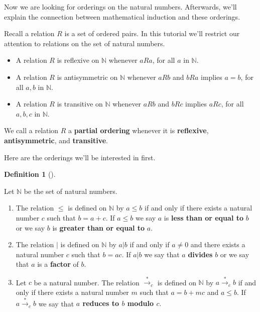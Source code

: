 \documentclass[
  twoside,
  12pt,
  letterpaper]{article}
\providecommand{\tightlist}{%
  \setlength{\itemsep}{0pt}\setlength{\parskip}{0pt}}\usepackage{longtable,booktabs,array}
\theoremstyle{definition}
\theoremstyle{plain}
\theoremstyle{plain}
\theoremstyle{definition}
\theoremstyle{definition}
\newtheorem{definition}{Definition}[section]
\theoremstyle{remark}
\begin{document}
Now we are looking for orderings on the natural numbers. Afterwards,
we'll explain the connection between mathematical induction and these
orderings.

Recall a relation \(R\) is a set of ordered pairs. In this tutorial
we'll restrict our attention to relations on the set of natural numbers.

\begin{itemize}
\tightlist
\item
  A relation \(R\) is reflexive on \(\mathbb{N}\) whenever \(aRa\), for
  all \(a\) in \(\mathbb{N}\).
\item
  A relation \(R\) is antisymmetric on \(\mathbb{N}\) whenever \(aRb\)
  and \(bRa\) implies \(a=b\), for all \(a,b\) in \(\mathbb{N}\).
\item
  A relation \(R\) is transitive on \(\mathbb{N}\) whenever \(aRb\) and
  \(bRc\) implies \(aRc\), for all \(a,b,c\) in \(\mathbb{N}\).
\end{itemize}

We call a relation \(R\) a \textbf{partial ordering} whenever it is
\textbf{reflexive}, \textbf{antisymmetric}, and \textbf{transitive}.

Here are the orderings we'll be interested in first.

\begin{definition}[]\protect\hypertarget{def-less-than-divides}{}\label{def-less-than-divides}

Let \(\mathbb{N}\) be the set of natural numbers.

\begin{enumerate}
\def\labelenumi{\arabic{enumi}.}
\tightlist
\item
  The relation \(\leq\) is defined on \(\mathbb{N}\) by \(a\leq b\) if
  and only if there exists a natural number \(c\) such that \(b=a+c.\)
  If \(a\leq b\) we say \(a\) is \textbf{less than or equal to} \(b\) or
  we say \(b\) is \textbf{greater than or equal to} \(a.\)
\item
  The relation \(\vert\) is defined on \(\mathbb{N}\) by \(a|b\) if and
  only if \(a\neq 0\) and there exists a natural number \(c\) such that
  \(b=ac.\) If \(a\vert b\) we say that \(a\) \textbf{divides} \(b\) or
  we say that \(a\) is a \textbf{factor} of \(b.\)
\item
  Let \(c\) be a natural number. The relation
  \(\overset{*}{\longrightarrow}_c\) is defined on \(\mathbb{N}\) by
  \(a\overset{*}{\longrightarrow}_c b\) if and only if there exists a
  natural number \(m\) such that \(a=b+mc\) and \(a\leq b.\) If
  \(a\overset{*}{\longrightarrow}_c b\) we say that \textbf{\(a\)
  reduces to \(b\) modulo \(c.\)}
\end{enumerate}

\end{definition}
\end{document}
